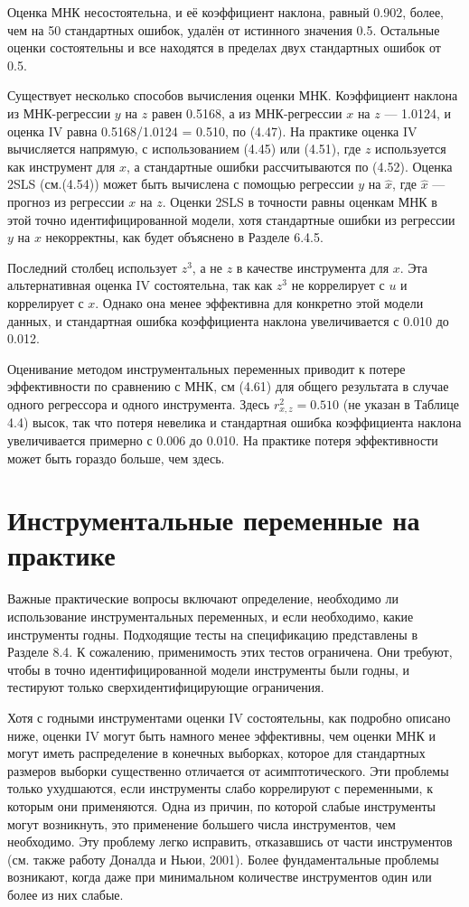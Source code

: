 Оценка МНК несостоятельна, и её коэффициент наклона, равный 0.902, более, чем на 50 стандартных ошибок, удалён от истинного значения 0.5. Остальные оценки состоятельны и все находятся в пределах двух стандартных ошибок от 0.5.

Существует несколько способов вычисления оценки МНК. Коэффициент наклона из МНК-регрессии $y$ на $z$ равен 0.5168, а из МНК-регрессии $x$ на $z$ --- 1.0124, и оценка IV равна 0.5168/1.0124 = 0.510, по (4.47). На практике оценка IV вычисляется напрямую, с использованием (4.45) или (4.51), где $z$ используется как инструмент для $x$, а стандартные ошибки рассчитываются по (4.52). Оценка 2SLS (см.(4.54)) может быть вычислена с помощью регрессии $y$ на $\hat{x}$, где $\hat{x}$ --- прогноз из регрессии $x$ на $z$. Оценки 2SLS в точности равны оценкам МНК в этой точно идентифицированной модели, хотя стандартные ошибки из регрессии $y$ на $x$ некорректны, как будет объяснено в Разделе 6.4.5.

Последний столбец использует $z^3$, а не $z$ в качестве инструмента для $x$. Эта альтернативная оценка IV состоятельна, так как $z^3$ не коррелирует с $u$ и коррелирует с $x$. Однако она менее эффективна для конкретно этой модели данных, и стандартная ошибка коэффициента наклона увеличивается с 0.010 до 0.012. 

Оценивание методом инструментальных переменных приводит к потере эффективности по сравнению с МНК, см (4.61) для общего результата в случае одного регрессора и одного инструмента. Здесь $r^2_{x,z}=0.510$ (не указан в Таблице 4.4) высок, так что потеря невелика и 	стандартная ошибка коэффициента наклона увеличивается примерно с 0.006 до 0.010. На практике потеря эффективности может быть гораздо больше, чем здесь.


\section{Инструментальные переменные на практике}

Важные практические вопросы включают определение, необходимо ли использование инструментальных переменных, и если необходимо, какие инструменты годны. Подходящие тесты на спецификацию представлены в Разделе 8.4. К сожалению, применимость этих тестов ограничена. Они требуют, чтобы в точно идентифицированной модели инструменты были годны, и тестируют только сверхидентифицирующие ограничения.

Хотя с годными инструментами оценки IV состоятельны, как подробно описано ниже, оценки IV могут быть намного менее эффективны, чем оценки МНК и могут иметь распределение в конечных выборках, которое для стандартных размеров выборки существенно отличается от асимптотического. Эти проблемы только ухудшаются,  если инструменты слабо коррелируют с переменными, к которым они применяются. Одна из причин, по которой слабые инструменты могут возникнуть, это применение большего числа инструментов, чем необходимо. Эту проблему легко исправить, отказавшись от части инструментов (см. также работу Доналда и Ньюи, 2001). Более фундаментальные проблемы возникают, когда даже при минимальном количестве инструментов один или более из них слабые. 

